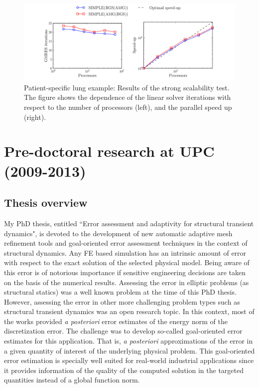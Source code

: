 \documentclass{article}
\newcommand{\bemph}[1]{#1}
\begin{document}
\begin{figure}[ht!]
\includegraphics[width=\textwidth]{../_assets/fig16.png}
\caption{Patient-specific lung example: Results of the strong scalability test. The figure shows the dependence of the linear solver iterations with respect to the number of processors (left), and the parallel speed up (right).}
\label{fig:medium-lung-scal}
\end{figure}

 
\section{Pre-doctoral research at UPC (2009-2013)}\label{sec:upc}

\subsection{Thesis overview}

My PhD thesis, entitled ``Error assessment and adaptivity for structural transient dynamics", is devoted to the development of new automatic adaptive mesh refinement tools and goal-oriented error assessment techniques in the context of structural dynamics. Any FE based simulation has an intrinsic amount of error with respect to the exact solution of the selected physical model. Being aware of this error is of notorious importance if sensitive engineering decisions are taken on the basis of the numerical results. Assessing the error in elliptic problems (as structural statics) was a well known problem at the time of this PhD thesis. However, assessing the error in other more challenging problem types such as structural transient dynamics was an open research topic. In this context, most of the works provided \emph{a posteriori} error estimates of the energy norm of the discretization error. The challenge was to develop so-called \bemph{goal-oriented} error estimates for this application. That is, \emph{a posteriori} approximations of the error in a given \bemph{quantity of interest} of the underlying physical problem. This goal-oriented error estimation is specially well suited for real-world industrial applications since it provides information of the quality of the computed solution in the targeted quantities instead of a global function norm. 
\end{document}
